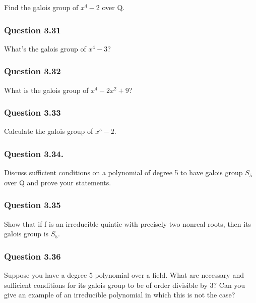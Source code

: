 Find the galois group of \(x^4 - 2\) over Q.

\hypertarget{question-3.31}{%
\subsubsection{Question 3.31}\label{question-3.31}}

What's the galois group of \(x^4 - 3\)?

\hypertarget{question-3.32}{%
\subsubsection{Question 3.32}\label{question-3.32}}

What is the galois group of \(x^4 - 2x^2 + 9\)?

\hypertarget{question-3.33}{%
\subsubsection{Question 3.33}\label{question-3.33}}

Calculate the galois group of \(x^5 - 2\).

\hypertarget{question-3.34.}{%
\subsubsection{Question 3.34.}\label{question-3.34.}}

Discuss suﬃcient conditions on a polynomial of degree 5 to have galois
group \(S_5\) over Q and prove your statements.

\hypertarget{question-3.35}{%
\subsubsection{Question 3.35}\label{question-3.35}}

Show that if f is an irreducible quintic with precisely two nonreal
roots, then its galois group is \(S_5\).

\hypertarget{question-3.36}{%
\subsubsection{Question 3.36}\label{question-3.36}}

Suppose you have a degree 5 polynomial over a field. What are necessary
and suﬃcient conditions for its galois group to be of order divisible by
3? Can you give an example of an irreducible polynomial in which this is
not the case?

